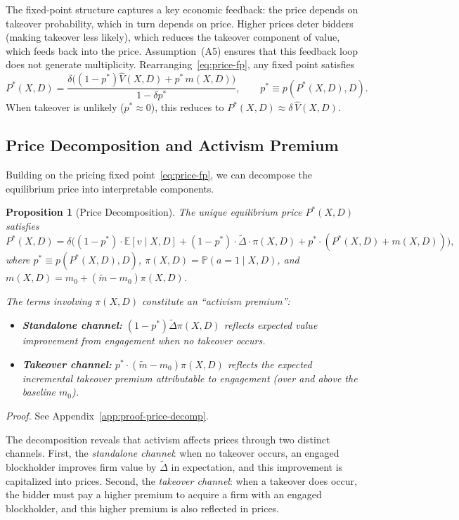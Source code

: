 \documentclass[11pt]{article}
\newtheorem{proposition}{Proposition}
\newcommand{\E}{\mathbb{E}}
\newcommand{\PP}{\mathbb{P}}
\newcommand{\1}{\mathbf{1}}
\begin{document}
The fixed-point structure captures a key economic feedback: the price depends on takeover probability, which in turn depends on price. Higher prices deter bidders (making takeover less likely), which reduces the takeover component of value, which feeds back into the price. Assumption~\textup{(A5)} ensures that this feedback loop does not generate multiplicity. Rearranging~\eqref{eq:price-fp}, any fixed point satisfies
\[
P^*(X,D)=\frac{\delta\big((1-p^*)\hat{V}(X,D)+p^*\,m(X,D)\big)}{1-\delta p^*},
\qquad p^*\equiv p(P^*(X,D),D).
\]
When takeover is unlikely ($p^*\approx 0$), this reduces to $P^*(X,D)\approx \delta\,\hat{V}(X,D)$.

\subsection{Price Decomposition and Activism Premium}

Building on the pricing fixed point~\eqref{eq:price-fp}, we can decompose the equilibrium price into interpretable components.

\begin{proposition}[Price Decomposition]
\label{prop:price-decomp}
The unique equilibrium price $P^*(X,D)$ satisfies
\[
P^*(X,D) = \delta\Big((1-p^*) \cdot \E[v \mid X,D] + (1-p^*) \cdot \tilde{\Delta} \cdot \pi(X,D) + p^* \cdot (P^*(X,D) + m(X,D))\Big),
\]
where $p^* \equiv p(P^*(X,D),D)$, $\pi(X,D) = \PP(a=1 \mid X,D)$, and $m(X,D) = m_0 + (\tilde{m} - m_0)\pi(X,D)$.

The terms involving $\pi(X,D)$ constitute an ``activism premium'':
\begin{itemize}[leftmargin=1.5em,itemsep=0pt]
\item \textbf{Standalone channel:} $(1-p^*)\tilde{\Delta}\pi(X,D)$ reflects expected value improvement from engagement when no takeover occurs.
\item \textbf{Takeover channel:} $p^* \cdot (\tilde{m}-m_0)\pi(X,D)$ reflects the expected \emph{incremental} takeover premium attributable to engagement (over and above the baseline $m_0$).
\end{itemize}
\end{proposition}
\textit{Proof.} See Appendix~\ref{app:proof-price-decomp}.

The decomposition reveals that activism affects prices through two distinct channels. First, the \emph{standalone channel}: when no takeover occurs, an engaged blockholder improves firm value by $\tilde{\Delta}$ in expectation, and this improvement is capitalized into prices. Second, the \emph{takeover channel}: when a takeover does occur, the bidder must pay a higher premium to acquire a firm with an engaged blockholder, and this higher premium is also reflected in prices.
\end{document}
